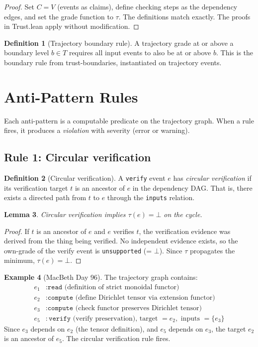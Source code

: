 \documentclass[11pt,a4paper]{article}
\theoremstyle{definition}
\newtheorem{definition}{Definition}[section]
\newtheorem{example}[definition]{Example}
\theoremstyle{plain}
\newtheorem{lemma}[definition]{Lemma}
\theoremstyle{remark}
\begin{document}
\begin{proof}
Set $C = V$ (events as claims), define checking steps as the dependency edges, and set the grade function to $\tau$. The definitions match exactly. The proofs in Trust.lean apply without modification.
\end{proof}

\begin{definition}[Trajectory boundary rule]
A trajectory grade at or above a boundary level $b \in T$ requires all input events to also be at or above $b$. This is the boundary rule from trust-boundaries, instantiated on trajectory events.
\end{definition}

\section{Anti-Pattern Rules}\label{sec:rules}

Each anti-pattern is a computable predicate on the trajectory graph. When a rule fires, it produces a \emph{violation} with severity (error or warning).

\subsection{Rule 1: Circular verification}

\begin{definition}[Circular verification]
A \texttt{verify} event $e$ has \emph{circular verification} if its verification target $t$ is an ancestor of $e$ in the dependency DAG. That is, there exists a directed path from $t$ to $e$ through the \texttt{inputs} relation.
\end{definition}

\begin{lemma}
Circular verification implies $\tau(e) = \bot$ on the cycle.
\end{lemma}

\begin{proof}
If $t$ is an ancestor of $e$ and $e$ verifies $t$, the verification evidence was derived from the thing being verified. No independent evidence exists, so the own-grade of the verify event is \texttt{unsupported} (= $\bot$). Since $\tau$ propagates the minimum, $\tau(e) = \bot$.
\end{proof}

\begin{example}[MacBeth Day 96]
The trajectory graph contains:
\begin{align*}
e_1 &: \texttt{read} \text{ (definition of strict monoidal functor)} \\
e_2 &: \texttt{compute} \text{ (define Dirichlet tensor via extension functor)} \\
e_3 &: \texttt{compute} \text{ (check functor preserves Dirichlet tensor)} \\
e_5 &: \texttt{verify} \text{ (verify preservation), target } = e_2, \text{ inputs } = \{e_3\}
\end{align*}
Since $e_3$ depends on $e_2$ (the tensor definition), and $e_5$ depends on $e_3$, the target $e_2$ is an ancestor of $e_5$. The circular verification rule fires.
\end{example}
\end{document}

